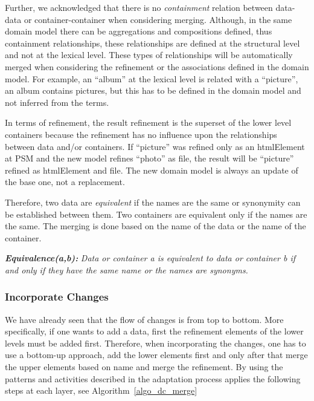 \documentclass{sig-alternate}
\begin{document}
Further, we acknowledged that there is no \textit{containment} relation between data-data or container-container when considering merging.
Although, in the same domain model there can be aggregations and compositions defined, thus containment relationships,
these relationships are defined at the structural level and not at the lexical level.
These types of relationships will be automatically merged when considering the refinement or the associations defined in the domain model.
For example, an ``album'' at the lexical level is related with a ``picture'', an album contains pictures, 
but this has to be defined in the domain model and not inferred from the terms.

In terms of refinement, the result refinement is the superset of the lower level containers
because the refinement has no influence upon the relationships between data and/or containers.
If ``picture'' was refined only as an htmlElement at PSM and the new model refines ``photo'' as file,
the result will be ``picture'' refined as htmlElement and file. 
The new domain model is always an update of the base one, not a replacement.

Therefore, two data are \textit{equivalent} if the names are the same or synonymity can be established between them.
Two containers are equivalent only if the names are the same.
The merging is done based on the name of the data or the name of the container.

\textbf{\textit{Equivalence(a,b):}} \textit{Data or container a is equivalent to data or container b if and only if they have the same name or the names are synonyms.}

\subsubsection{Incorporate Changes}

We have already seen that the flow of changes is from top to bottom.
More specifically, if one wants to add a data, first the refinement elements of the lower levels must be added first.
Therefore, when incorporating the changes, one has to use a bottom-up approach,
add the lower elements first and only after that merge the upper elements based on name and merge the refinement.
By using the patterns and activities described in \cite{adaptive1, adaptive2} the adaptation process applies the following steps at each layer, see Algorithm~\ref{algo_dc_merge} 
\end{document}
